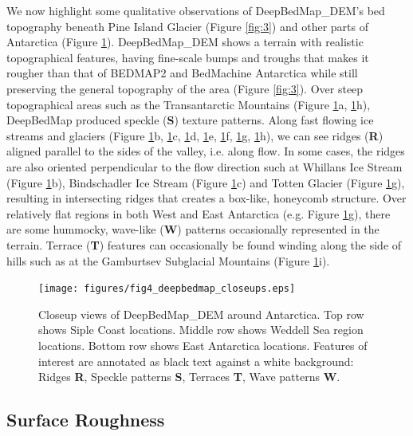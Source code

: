 \documentclass[tc, manuscript]{copernicus}
\begin{document}
We now highlight some qualitative observations of DeepBedMap\_DEM's bed topography beneath Pine Island Glacier (Figure \ref{fig:3}) and other parts of Antarctica (Figure \ref{fig:4}).
DeepBedMap\_DEM shows a terrain with realistic topographical features, having fine-scale bumps and troughs that makes it rougher than that of BEDMAP2 \citep{FretwellBedmap2improvedice2013} and BedMachine Antarctica \citep{MorlighemMEaSUREsBedMachineAntarctica2019} while still preserving the general topography of the area (Figure \ref{fig:3}).
Over steep topographical areas such as the Transantarctic Mountains (Figure \ref{fig:4}a, \ref{fig:4}h), DeepBedMap produced speckle (\textbf{S}) texture patterns.
Along fast flowing ice streams and glaciers (Figure \ref{fig:4}b, \ref{fig:4}c, \ref{fig:4}d, \ref{fig:4}e, \ref{fig:4}f, \ref{fig:4}g, \ref{fig:4}h), we can see ridges (\textbf{R}) aligned parallel to the sides of the valley, i.e. along flow.
In some cases, the ridges are also oriented perpendicular to the flow direction such at Whillans Ice Stream (Figure \ref{fig:4}b), Bindschadler Ice Stream (Figure \ref{fig:4}c) and Totten Glacier (Figure \ref{fig:4}g), resulting in intersecting ridges that creates a box-like, honeycomb structure.
Over relatively flat regions in both West and East Antarctica (e.g. Figure \ref{fig:4}g), there are some hummocky, wave-like (\textbf{W}) patterns occasionally represented in the terrain.
Terrace (\textbf{T}) features can occasionally be found winding along the side of hills such as at the Gamburtsev Subglacial Mountains (Figure \ref{fig:4}i).


\begin{figure}[htbp]
  \texttt{[image: figures/fig4\_deepbedmap\_closeups.eps]}
  \caption{
    Closeup views of DeepBedMap\_DEM around Antarctica.
    Top row shows Siple Coast locations.
    Middle row shows Weddell Sea region locations.
    Bottom row shows East Antarctica locations.
    Features of interest are annotated as black text against a white background:
    Ridges \textbf{R}, Speckle patterns \textbf{S}, Terraces \textbf{T}, Wave patterns \textbf{W}.
  }
  \label{fig:4}
\end{figure}

\subsection{Surface Roughness} \label{section:surfaceroughness}
\end{document}
